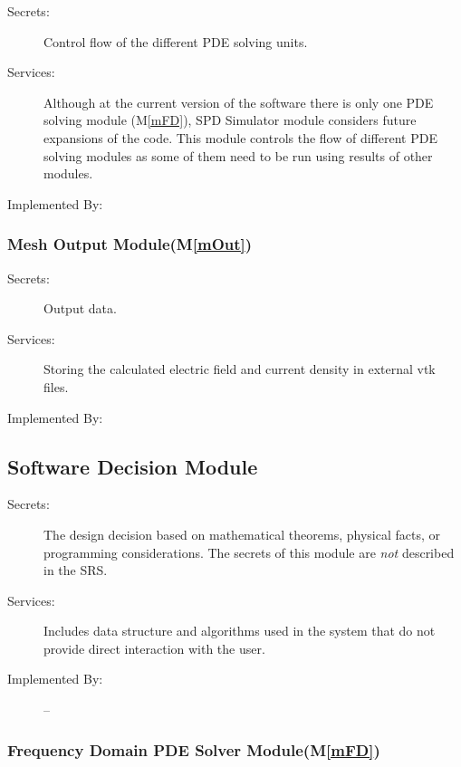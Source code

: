 \documentclass[12pt, titlepage]{article}
\newcommand{\mref}[1]{M\ref{#1}}
\begin{document}
\begin{description}
	\item[Secrets:]Control flow of the different PDE solving units.
	\item[Services:]Although at the current version of the software there is only one PDE solving module (M\ref{mFD}), SPD Simulator module considers future expansions of the code. This module controls the flow of different PDE solving modules as some of them need to be run using results of other modules. 
	\item[Implemented By:] \progname{}
\end{description}

\subsubsection{Mesh Output Module(\mref{mOut})}

\begin{description}
	\item[Secrets:]Output data.
	\item[Services:]Storing the calculated electric field and current density in external vtk files.
	\item[Implemented By:] \progname{}
\end{description}


\subsection{Software Decision Module}

\begin{description}
\item[Secrets:] The design decision based on mathematical theorems, physical
  facts, or programming considerations. The secrets of this module are
  \emph{not} described in the SRS.
\item[Services:] Includes data structure and algorithms used in the system that
  do not provide direct interaction with the user. 
\item[Implemented By:] --
\end{description}


\subsubsection{Frequency Domain PDE Solver Module(\mref{mFD})}
\end{document}
